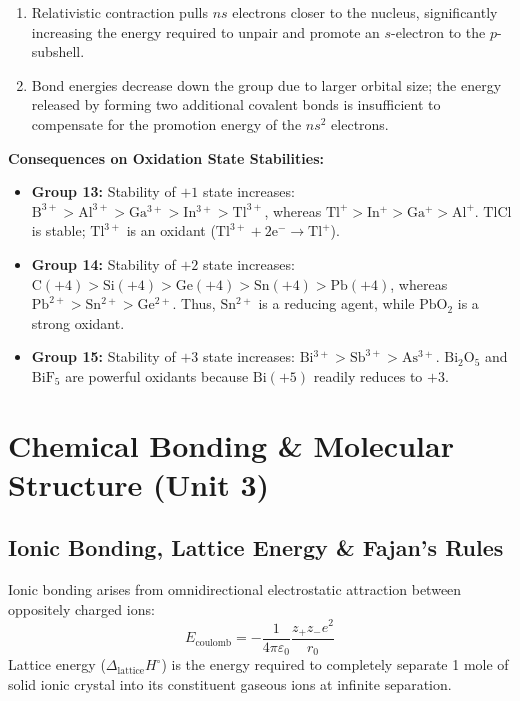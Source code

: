 \documentclass[10pt,a4paper]{article}
\begin{document}
\begin{itemize}
\begin{enumerate}
    \item Relativistic contraction pulls $ns$ electrons closer to the nucleus, significantly increasing the energy required to unpair and promote an $s$-electron to the $p$-subshell.
    \item Bond energies decrease down the group due to larger orbital size; the energy released by forming two additional covalent bonds is insufficient to compensate for the promotion energy of the $ns^2$ electrons.
  \end{enumerate}
  \textbf{Consequences on Oxidation State Stabilities:}
  \begin{itemize}
    \item \textbf{Group 13:} Stability of $+1$ state increases: $\mathrm{B^{3+}} > \mathrm{Al^{3+}} > \mathrm{Ga^{3+}} > \mathrm{In^{3+}} > \mathrm{Tl^{3+}}$, whereas $\mathbf{\mathrm{Tl^+}} > \mathbf{\mathrm{In^+}} > \mathbf{\mathrm{Ga^+}} > \mathbf{\mathrm{Al^+}}$. $\mathrm{TlCl}$ is stable; $\mathrm{Tl^{3+}}$ is an oxidant ($\mathrm{Tl^{3+} + 2e^- \to Tl^+}$).
    \item \textbf{Group 14:} Stability of $+2$ state increases: $\mathrm{C(+4)} > \mathrm{Si(+4)} > \mathrm{Ge(+4)} > \mathrm{Sn(+4)} > \mathrm{Pb(+4)}$, whereas $\mathbf{\mathrm{Pb^{2+}}} > \mathbf{\mathrm{Sn^{2+}}} > \mathbf{\mathrm{Ge^{2+}}}$. Thus, $\mathrm{Sn^{2+}}$ is a reducing agent, while $\mathrm{PbO_2}$ is a strong oxidant.
    \item \textbf{Group 15:} Stability of $+3$ state increases: $\mathbf{\mathrm{Bi^{3+}}} > \mathbf{\mathrm{Sb^{3+}}} > \mathbf{\mathrm{As^{3+}}}$. $\mathrm{Bi_2O_5}$ and $\mathrm{BiF_5}$ are powerful oxidants because $\mathrm{Bi(+5)}$ readily reduces to $+3$.
  \end{itemize}
\end{itemize}

\section{Chemical Bonding \& Molecular Structure (Unit 3)}

\subsection{Ionic Bonding, Lattice Energy \& Fajan's Rules}
Ionic bonding arises from omnidirectional electrostatic attraction between oppositely charged ions:
\begin{equation}
  E_{\text{coulomb}} = -\frac{1}{4\pi\varepsilon_0}\frac{z_+ z_- e^2}{r_0}
\end{equation}
Lattice energy ($\Delta_{\text{lattice}} H^\circ$) is the energy required to completely separate 1 mole of solid ionic crystal into its constituent gaseous ions at infinite separation.
\end{document}
